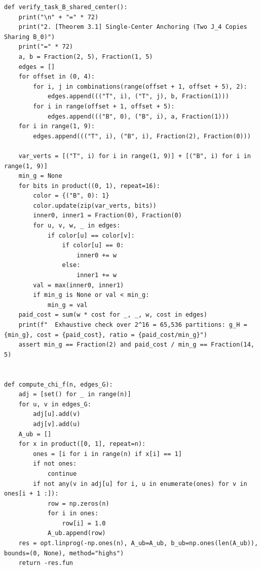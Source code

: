 \documentclass[11pt,a4paper]{ctexart}
\theoremstyle{definition}
\newcommand{\1}{\boldsymbol 1}
\newcommand{\0}{\boldsymbol 0}
\begin{document}
\begin{lstlisting}[style=pycode,caption={一般 $B_{\rm graph}$ 核心定理与复杂性归约构件精确复核脚本（\texttt{Bgraph\_breakthrough\_verify.py}）}]
def verify_task_B_shared_center():
    print("\n" + "=" * 72)
    print("2. [Theorem 3.1] Single-Center Anchoring (Two J_4 Copies Sharing B_0)")
    print("=" * 72)
    a, b = Fraction(2, 5), Fraction(1, 5)
    edges = []
    for offset in (0, 4):
        for i, j in combinations(range(offset + 1, offset + 5), 2):
            edges.append((("T", i), ("T", j), b, Fraction(1)))
        for i in range(offset + 1, offset + 5):
            edges.append((("B", 0), ("B", i), a, Fraction(1)))
    for i in range(1, 9):
        edges.append((("T", i), ("B", i), Fraction(2), Fraction(0)))

    var_verts = [("T", i) for i in range(1, 9)] + [("B", i) for i in range(1, 9)]
    min_g = None
    for bits in product((0, 1), repeat=16):
        color = {("B", 0): 1}
        color.update(zip(var_verts, bits))
        inner0, inner1 = Fraction(0), Fraction(0)
        for u, v, w, _ in edges:
            if color[u] == color[v]:
                if color[u] == 0:
                    inner0 += w
                else:
                    inner1 += w
        val = max(inner0, inner1)
        if min_g is None or val < min_g:
            min_g = val
    paid_cost = sum(w * cost for _, _, w, cost in edges)
    print(f"  Exhaustive check over 2^16 = 65,536 partitions: g_H = {min_g}, cost = {paid_cost}, ratio = {paid_cost/min_g}")
    assert min_g == Fraction(2) and paid_cost / min_g == Fraction(14, 5)


def compute_chi_f(n, edges_G):
    adj = [set() for _ in range(n)]
    for u, v in edges_G:
        adj[u].add(v)
        adj[v].add(u)
    A_ub = []
    for x in product([0, 1], repeat=n):
        ones = [i for i in range(n) if x[i] == 1]
        if not ones:
            continue
        if not any(v in adj[u] for i, u in enumerate(ones) for v in ones[i + 1 :]):
            row = np.zeros(n)
            for i in ones:
                row[i] = 1.0
            A_ub.append(row)
    res = opt.linprog(-np.ones(n), A_ub=A_ub, b_ub=np.ones(len(A_ub)), bounds=(0, None), method="highs")
    return -res.fun



\end{lstlisting}
\end{document}
